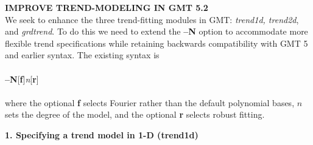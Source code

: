 \documentclass[12pt,letterpaper,margin=0.5in]{report}
\begin{document}
\noindent
{\bf IMPROVE TREND-MODELING IN GMT 5.2} \\

We seek to enhance the three trend-fitting modules in GMT: {\it trend1d, trend2d}, and {\it grdtrend}.
To do this we need to extend the {\bf --N} option to accommodate more flexible trend specifications
while retaining backwards compatibility with GMT 5 and earlier syntax.  The existing syntax is
\\ \\
{\bf --N}[{\bf f}]{\it n}[{\bf r}]
\\ \\
where the optional {\bf f} selects Fourier rather than the default polynomial bases, $n$ sets the degree of
the model, and the optional {\bf r} selects robust fitting.

\par
\noindent
{\bf 1. Specifying a trend model in 1-D (trend1d)}
\noindent
\end{document}
